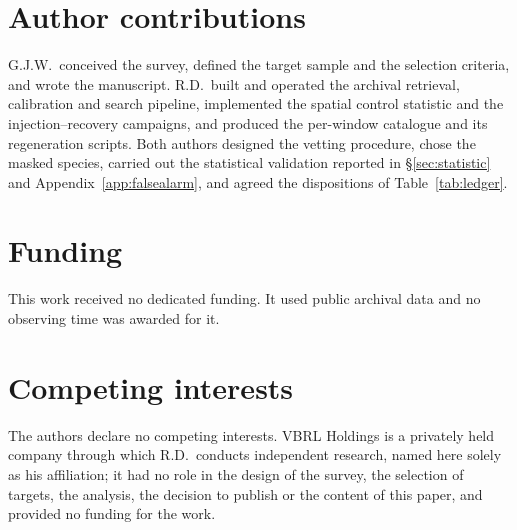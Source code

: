 \section*{Author contributions}
G.J.W.\ conceived the survey, defined the target sample and the selection
criteria, and wrote the manuscript. R.D.\ built and operated the archival
retrieval, calibration and search pipeline, implemented the spatial control
statistic and the injection--recovery campaigns, and produced the per-window
catalogue and its regeneration scripts. Both authors designed the vetting
procedure, chose the masked species, carried out the statistical
validation reported in \S\ref{sec:statistic} and
Appendix~\ref{app:falsealarm}, and agreed the dispositions of
Table~\ref{tab:ledger}.

\section*{Funding}
This work received no dedicated funding. It used public archival data and
no observing time was awarded for it.

\section*{Competing interests}
The authors declare no competing interests. VBRL Holdings is a privately
held company through which R.D.\ conducts independent research, named
here solely as his affiliation; it had no role in the design of the
survey, the selection of targets, the analysis, the decision to publish
or the content of this paper, and provided no funding for the work.

